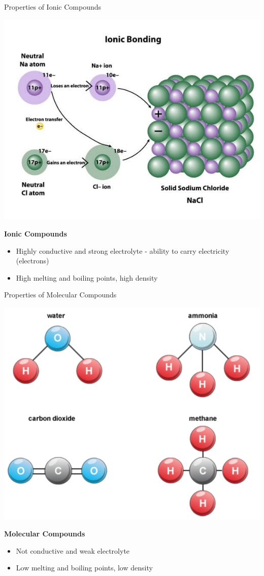 \documentclass[11pt]{beamer}
\begin{document}
\begin{frame}{Properties of Ionic Compounds}
  \begin{center}
    \includegraphics[width=0.6\linewidth]{Ionic-bond-example}
  \end{center}
  \vspace{-0.3in}
  \textbf{Ionic Compounds}
  \begin{itemize}
  \item Highly conductive and strong electrolyte - ability to
    carry electricity (electrons)
  \item High melting and boiling points, high density
  \end{itemize}
\end{frame}

\begin{frame}{Properties of Molecular Compounds}
  \begin{center}
    \includegraphics[width=0.6\linewidth]{molec_example}
  \end{center}
  \vspace{-0.3in}
  \textbf{Molecular Compounds}
  \begin{itemize}
  \item Not conductive and weak electrolyte
  \item Low melting and boiling points, low density
  \end{itemize}
\end{frame}
\end{document}

